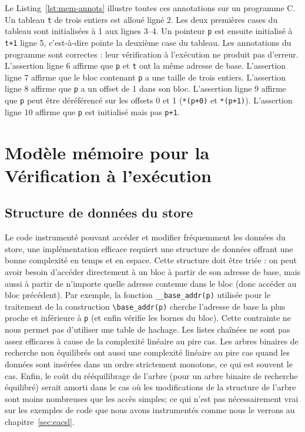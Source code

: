 


Le Listing~\ref{lst:mem-annots} illustre toutes ces annotations sur un programme
C.
Un tableau \lstinline't' de trois entiers est alloué ligné 2.
Les deux premières cases du tableau sont initialisées à 1 aux lignes 3--4.
Un pointeur \lstinline'p' est ensuite initialisé à \lstinline't+1' ligne 5,
c'est-à-dire pointe la deuxième case du tableau.
Les annotations du programme sont correctes : leur vérification à l'exécution
ne produit pas d'erreur.
L'assertion ligne 6 affirme que \lstinline'p' et \lstinline't' ont la même
adresse de base.
L'assertion ligne 7 affirme que le bloc contenant \lstinline'p' a une taille de
trois entiers.
L'assertion ligne 8 affirme que \lstinline'p' a un offset de 1 dans son bloc.
L'assertion ligne 9 affirme que \lstinline'p' peut être déréférencé sur les
offsets 0 et 1 (\lstinline'*(p+0)' et \lstinline'*(p+1)').
L'assertion ligne 10 affirme que \lstinline'p' est initialisé mais pas
\lstinline'p+1'.


\section{Modèle mémoire pour la Vérification à l'exécution}
\label{sec:mem-model}


\subsection{Structure de données du store}

Le code instrumenté pouvant accéder et modifier fréquemment les données du
store, une implémentation efficace requiert une structure de données
offrant une bonne complexité en temps et en espace.
Cette structure doit être triée : on peut avoir besoin d'accéder directement à
un bloc à partir de son adresse de base, mais aussi à partir de n'importe quelle
adresse contenue dans le bloc (donc accéder au bloc précédent).
Par exemple, la fonction \lstinline'__base_addr(p)' utilisée pour le traitement
de la construction \acsl \lstinline'\base_addr(p)' cherche l'adresse de base la
plus proche et inférieure à \lstinline'p' (et enfin vérifie les bornes du bloc).
Cette contrainte ne nous permet pas d'utiliser une table de hachage.
Les listes chaînées ne sont pas assez efficaces à cause de la complexité
linéaire au pire cas.
Les arbres binaires de recherche non équilibrés ont aussi une complexité
linéaire au pire cas quand les données sont insérées dans un ordre strictement
monotone, ce qui est souvent le cas.
Enfin, le coût du rééquilibrage de l'arbre (pour un arbre binaire de recherche
équilibré) serait amorti dans le cas où les modifications de la structure de
l'arbre sont moins nombreuses que les accès simples; ce qui n'est pas
nécessairement vrai sur les exemples de code que nous avons instrumentés comme
nous le verrons au chapitre~\ref{sec:eacsl}.

